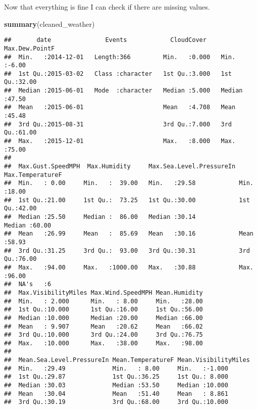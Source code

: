 \documentclass[
]{article}
\newenvironment{Shaded}{\begin{snugshade}}{\end{snugshade}}
\newcommand{\KeywordTok}[1]{\textcolor[rgb]{0.13,0.29,0.53}{\textbf{#1}}}
\newcommand{\NormalTok}[1]{#1}
\begin{document}
Now that everything is fine I can check if there are missing values.

\begin{Shaded}
\begin{Highlighting}[]
\KeywordTok{summary}\NormalTok{(cleaned_weather)}
\end{Highlighting}
\end{Shaded}

\begin{verbatim}
##       date               Events            CloudCover    Max.Dew.PointF 
##  Min.   :2014-12-01   Length:366         Min.   :0.000   Min.   :-6.00  
##  1st Qu.:2015-03-02   Class :character   1st Qu.:3.000   1st Qu.:32.00  
##  Median :2015-06-01   Mode  :character   Median :5.000   Median :47.50  
##  Mean   :2015-06-01                      Mean   :4.708   Mean   :45.48  
##  3rd Qu.:2015-08-31                      3rd Qu.:7.000   3rd Qu.:61.00  
##  Max.   :2015-12-01                      Max.   :8.000   Max.   :75.00  
##                                                                         
##  Max.Gust.SpeedMPH  Max.Humidity     Max.Sea.Level.PressureIn Max.TemperatureF
##  Min.   : 0.00     Min.   :  39.00   Min.   :29.58            Min.   :18.00   
##  1st Qu.:21.00     1st Qu.:  73.25   1st Qu.:30.00            1st Qu.:42.00   
##  Median :25.50     Median :  86.00   Median :30.14            Median :60.00   
##  Mean   :26.99     Mean   :  85.69   Mean   :30.16            Mean   :58.93   
##  3rd Qu.:31.25     3rd Qu.:  93.00   3rd Qu.:30.31            3rd Qu.:76.00   
##  Max.   :94.00     Max.   :1000.00   Max.   :30.88            Max.   :96.00   
##  NA's   :6                                                                    
##  Max.VisibilityMiles Max.Wind.SpeedMPH Mean.Humidity  
##  Min.   : 2.000      Min.   : 8.00     Min.   :28.00  
##  1st Qu.:10.000      1st Qu.:16.00     1st Qu.:56.00  
##  Median :10.000      Median :20.00     Median :66.00  
##  Mean   : 9.907      Mean   :20.62     Mean   :66.02  
##  3rd Qu.:10.000      3rd Qu.:24.00     3rd Qu.:76.75  
##  Max.   :10.000      Max.   :38.00     Max.   :98.00  
##                                                       
##  Mean.Sea.Level.PressureIn Mean.TemperatureF Mean.VisibilityMiles
##  Min.   :29.49             Min.   : 8.00     Min.   :-1.000      
##  1st Qu.:29.87             1st Qu.:36.25     1st Qu.: 8.000      
##  Median :30.03             Median :53.50     Median :10.000      
##  Mean   :30.04             Mean   :51.40     Mean   : 8.861      
##  3rd Qu.:30.19             3rd Qu.:68.00     3rd Qu.:10.000      

\end{verbatim}
\end{document}
